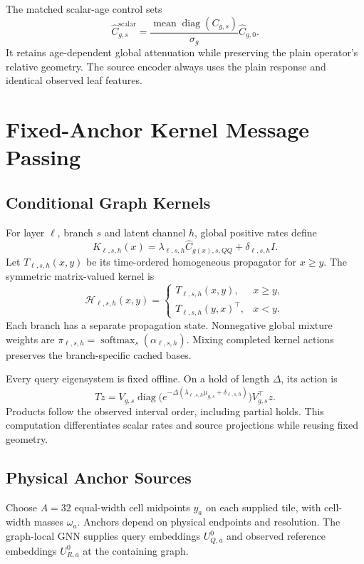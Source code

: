 \documentclass[letterpaper]{article}
\begin{document}
The matched scalar-age control sets
\begin{equation}
 \widehat C^{\mathrm{scalar}}_{g,s}
 =\frac{\operatorname{mean}\operatorname{diag}(C_{g,s})}{\sigma_g}
 \widehat C_{g,0}.
\end{equation}
It retains age-dependent global attenuation while preserving the plain operator's relative geometry. The source encoder always uses the plain response and identical observed leaf features.


\section{Fixed-Anchor Kernel Message Passing}
\subsection{Conditional Graph Kernels}
For layer $\ell$, branch $s$ and latent channel $h$, global positive rates define
\begin{equation}
 K_{\ell,s,h}(x)=
 \lambda_{\ell,s,h}\widehat C_{g(x),s,QQ}
 +\delta_{\ell,s,h}I.
\end{equation}
Let $T_{\ell,s,h}(x,y)$ be its time-ordered homogeneous propagator for $x\geq y$. The symmetric matrix-valued kernel is
\begin{equation}
 \mathcal H_{\ell,s,h}(x,y)=
 \begin{cases}
 T_{\ell,s,h}(x,y),&x\geq y,\\
 T_{\ell,s,h}(y,x)^\top,&x<y.
 \end{cases}
\end{equation}
Each branch has a separate propagation state. Nonnegative global mixture weights are $\pi_{\ell,s,h}=\operatorname{softmax}_s(\alpha_{\ell,s,h})$. Mixing completed kernel actions preserves the branch-specific cached bases.

Every query eigensystem is fixed offline. On a hold of length $\Delta$, its action is
\begin{equation}
 Tz=V_{g,s}\operatorname{diag}
 \big(e^{-\Delta(\lambda_{\ell,s,h}\mu_{g,s}+\delta_{\ell,s,h})}\big)
 V_{g,s}^\top z.
\end{equation}
Products follow the observed interval order, including partial holds. This computation differentiates scalar rates and source projections while reusing fixed geometry.

\subsection{Physical Anchor Sources}
Choose $A=32$ equal-width cell midpoints $y_a$ on each supplied tile, with cell-width masses $\omega_a$. Anchors depend on physical endpoints and resolution. The graph-local GNN supplies query embeddings $U^0_{Q,a}$ and observed reference embeddings $U^0_{R,a}$ at the containing graph.
\end{document}
